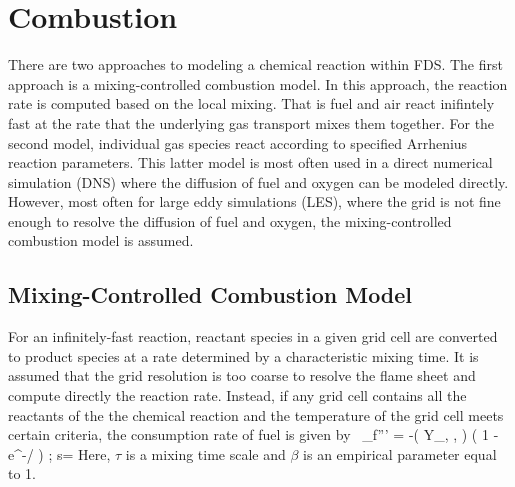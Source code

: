\chapter{Combustion}

\label{combustionsection}

There are two approaches to modeling a chemical reaction within FDS.  The first approach is a mixing-controlled combustion model.  In this approach, the reaction rate is computed based on the local mixing.  That is fuel and air react inifintely fast at the rate that the underlying gas transport mixes them together.  For the second model, individual gas species react according to
specified Arrhenius reaction parameters. This latter model is most often used in a
direct numerical simulation (DNS) where the diffusion of fuel and oxygen can be
modeled directly.
However, most often for large eddy simulations (LES), where the grid is not
fine enough to resolve the diffusion of fuel and oxygen,
the mixing-controlled combustion model is assumed.

\section{Mixing-Controlled Combustion Model}

For an infinitely-fast reaction, reactant species in a given grid cell are converted to product species at a rate determined by a
characteristic mixing time.  It is assumed that the
grid resolution is too coarse to resolve the flame sheet and compute directly the reaction rate.  Instead, if any grid cell contains all the reactants of the the chemical reaction and the temperature of the grid cell meets certain criteria, the consumption rate of fuel is given by~\cite{Poinsot:TNC}
\be \dm_f''' = -\rho \min \left( Y_\F , , \beta {} \right) \; \left( 1 - e^{-\dt/\tau} \right)   \quad ; \quad
   s=  \label{EDC} \ee
Here, $\tau$ is a mixing time scale and $\beta$ is an empirical parameter equal to 1.

